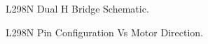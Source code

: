 \documentclass[fontsize=11pt, %
                             paper=letter, %
                             twoside, %
                             captions=tableheading,
                             index=totoc,
                             hyperref]{labbook}
\begin{document}
\begin{figure}
  \centering
  \caption{L298N Dual H Bridge Schematic.}
  \label{fig:L298NSchematic}
\end{figure}

\begin{figure}
  \centering
  \caption{L298N Pin Configuration Vs Motor Direction.}
  \label{fig:PinConfigL298N}
\end{figure}
\end{document}
